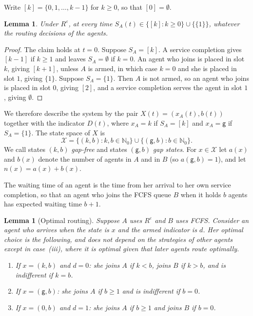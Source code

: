\documentclass[11pt]{article}
\newtheorem{blem}[bthm]{Lemma}
\theoremstyle{definition}
\theoremstyle{remark}
\newcommand{\N}{\mathbb{N}}
\newcommand{\cX}{\mathcal{X}}
\newcommand{\Reps}{R^{\varepsilon}}
\newcommand{\gp}{\mathsf{g}}
\begin{document}
Write $[k]=\{0,1,\dots,k-1\}$ for $k\ge 0$, so that $[0]=\emptyset$.

\begin{blem}\label{lem:states}
Under $\Reps$, at every time $S_A(t)\in\{[k]:k\ge0\}\cup\{\{1\}\}$, whatever
the routing decisions of the agents.
\end{blem}

\begin{proof}
The claim holds at $t=0$. Suppose $S_A=[k]$. A service completion gives
$[k-1]$ if $k\ge1$ and leaves $S_A=\emptyset$ if $k=0$. An agent who joins is
placed in slot $k$, giving $[k+1]$, unless $A$ is armed, in which case $k=0$
and she is placed in slot $1$, giving $\{1\}$. Suppose $S_A=\{1\}$. Then $A$ is
not armed, so an agent who joins is placed in slot $0$, giving $[2]$, and a
service completion serves the agent in slot $1$, giving $\emptyset$.
\end{proof}

We therefore describe the system by the pair $X(t)=(x_A(t),b(t))$ together
with the indicator $D(t)$, where $x_A=k$ if $S_A=[k]$ and $x_A=\gp$ if
$S_A=\{1\}$. The state space of $X$ is
\[
  \cX=\{(k,b):k,b\in\N_0\}\cup\{(\gp,b):b\in\N_0\}.
\]
We call states $(k,b)$ \emph{gap-free} and states $(\gp,b)$ \emph{gap states}.
For $x\in\cX$ let $a(x)$ and $b(x)$ denote the number of agents in $A$ and in
$B$ (so $a(\gp,b)=1$), and let $n(x)=a(x)+b(x)$.

The waiting time of an agent is the time from her arrival to her own service
completion, so that an agent who joins the FCFS queue $B$ when it holds $b$
agents has expected waiting time $b+1$.

\begin{blem}[Optimal routing]\label{lem:routing}
Suppose $A$ uses $\Reps$ and $B$ uses FCFS. Consider an agent who arrives when
the state is $x$ and the armed indicator is $d$. Her optimal choice is the
following, and does not depend on the strategies of other agents except in
case~\emph{(iii)}, where it is optimal given that later agents route optimally.
\begin{enumerate}
\item[(i)] If $x=(k,b)$ and $d=0$: she joins $A$ if $k<b$, joins $B$ if $k>b$,
  and is indifferent if $k=b$.
\item[(ii)] If $x=(\gp,b)$: she joins $A$ if $b\ge1$ and is indifferent if
  $b=0$.
\item[(iii)] If $x=(0,b)$ and $d=1$: she joins $A$ if $b\ge1$ and joins $B$ if
  $b=0$.
\end{enumerate}
\end{blem}
\end{document}
